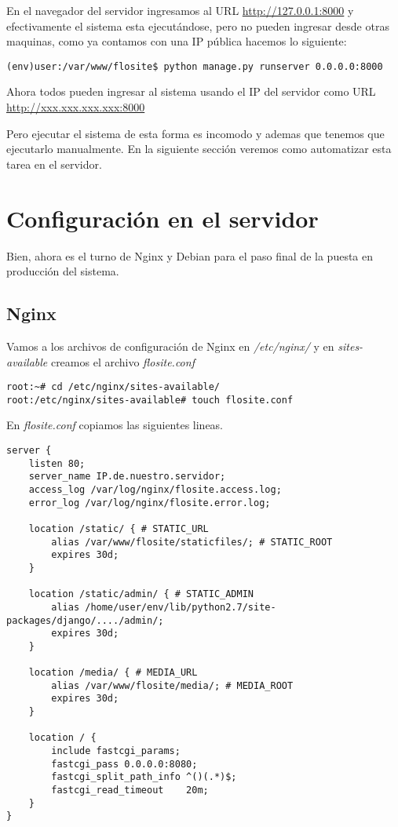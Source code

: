 En el navegador del servidor ingresamos al URL \url{http://127.0.0.1:8000} y
efectivamente el sistema esta ejecutándose, pero no pueden ingresar desde otras
maquinas, como ya contamos con una IP pública hacemos lo siguiente:

\begin{verbatim}
(env)user:/var/www/flosite$ python manage.py runserver 0.0.0.0:8000
\end{verbatim}

Ahora todos pueden ingresar al sistema usando el IP del servidor como URL
\url{http://xxx.xxx.xxx.xxx:8000}

Pero ejecutar el sistema de esta forma es incomodo y ademas que tenemos que
ejecutarlo manualmente. En la siguiente sección veremos como automatizar esta
tarea en el servidor.

\section{Configuración en el servidor}
Bien, ahora es el turno de Nginx y Debian para el paso final de la puesta en
producción del sistema.

\subsection{Nginx}
Vamos a los archivos de configuración de Nginx en {\it /etc/nginx/} y en
{\it sites-available} creamos el archivo {\it flosite.conf}

\begin{verbatim}
root:~# cd /etc/nginx/sites-available/
root:/etc/nginx/sites-available# touch flosite.conf
\end{verbatim}

En {\it flosite.conf} copiamos las siguientes lineas.

\begin{verbatim}
server {
    listen 80;
    server_name IP.de.nuestro.servidor;
    access_log /var/log/nginx/flosite.access.log;
    error_log /var/log/nginx/flosite.error.log;

    location /static/ { # STATIC_URL
        alias /var/www/flosite/staticfiles/; # STATIC_ROOT
        expires 30d;
    }

    location /static/admin/ { # STATIC_ADMIN
        alias /home/user/env/lib/python2.7/site-packages/django/..../admin/;
        expires 30d;
    }

    location /media/ { # MEDIA_URL
        alias /var/www/flosite/media/; # MEDIA_ROOT
        expires 30d;
    }

    location / {
        include fastcgi_params;
        fastcgi_pass 0.0.0.0:8080;
        fastcgi_split_path_info ^()(.*)$;
        fastcgi_read_timeout    20m;
    }
}
\end{verbatim}

